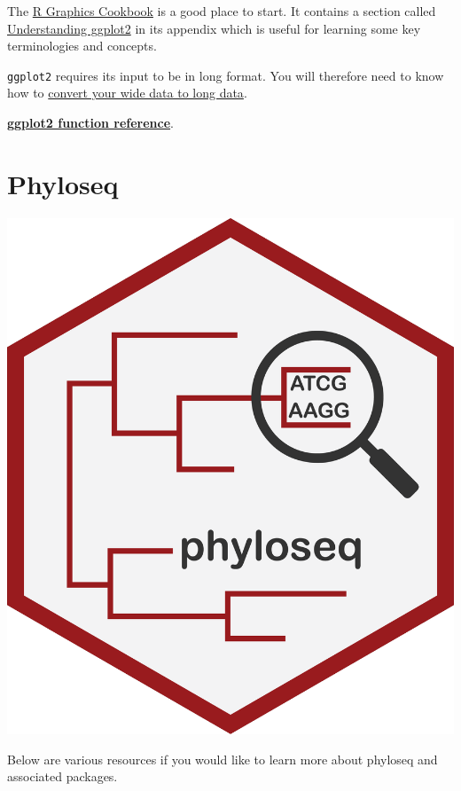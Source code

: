 \documentclass[
]{book}
\begin{document}
The \href{https://r-graphics.org/}{R Graphics Cookbook} is a good place to start. It contains a section called \href{https://r-graphics.org/chapter-ggplot2}{Understanding ggplot2} in its appendix which is useful for learning some key terminologies and concepts.

\texttt{ggplot2} requires its input to be in long format. You will therefore need to know how to \protect\hyperlink{http:ux2fux2fwww.cookbook-r.comux2fManipulating_dataux2fConverting_data_between_wide_and_long_formatux2f}{convert your wide data to long data}.

\href{https://ggplot2.tidyverse.org/reference/\#layers}{\textbf{ggplot2 function reference}}.

\hypertarget{phyloseq_appendix}{%
\section{Phyloseq}\label{phyloseq_appendix}}

\includegraphics{figures/phyloseq_logo.png}

Below are various resources if you would like to learn more about phyloseq and associated packages.
\end{document}
